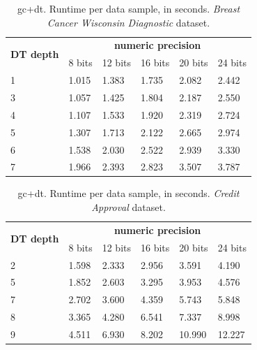 \begin{table}[htp]
\centering
\caption{\acs{gc}+\acs{dt}. Runtime per data sample, in seconds. \emph{Breast Cancer Wisconsin Diagnostic} dataset.}
\label{table:runtimeDTBCW}
\begin{tabular}{|l|l|l|l|l|l|}
\hline
\multirow{2}{*}{\textbf{DT depth}} & \multicolumn{5}{c|}{\textbf{numeric precision}}         \\ \cline{2-6} 
                          & 8 bits & 12 bits & 16 bits & 20 bits & 24 bits \\ \hline
1                         & 1.015  & 1.383   & 1.735   & 2.082   & 2.442   \\ \hline
3                         & 1.057  & 1.425   & 1.804   & 2.187   & 2.550   \\ \hline
4                         & 1.107  & 1.533   & 1.920   & 2.319   & 2.724   \\ \hline
5                         & 1.307  & 1.713   & 2.122   & 2.665   & 2.974   \\ \hline
6                         & 1.538  & 2.030   & 2.522   & 2.939   & 3.330   \\ \hline
7                         & 1.966  & 2.393   & 2.823   & 3.507   & 3.787   \\ \hline
\end{tabular}
\end{table}


\begin{table}[htp]
\centering
\caption{\acs{gc}+\acs{dt}. Runtime per data sample, in seconds. \emph{Credit Approval} dataset.}
\label{table:runtimeDTCA}
\begin{tabular}{|l|l|l|l|l|l|}
\hline
\multirow{2}{*}{\textbf{DT depth}} & \multicolumn{5}{c|}{\textbf{numeric precision}}         \\ \cline{2-6} 
                          & 8 bits & 12 bits & 16 bits & 20 bits & 24 bits \\ \hline
2                         & 1.598  & 2.333   & 2.956   & 3.591   & 4.190   \\ \hline
5                         & 1.852  & 2.603   & 3.295   & 3.953   & 4.576   \\ \hline
7                         & 2.702  & 3.600   & 4.359   & 5.743   & 5.848   \\ \hline
8                         & 3.365  & 4.280   & 6.541   & 7.337   & 8.998   \\ \hline
9                         & 4.511  & 6.930   & 8.202   & 10.990  & 12.227  \\ \hline
\end{tabular}
\end{table}


